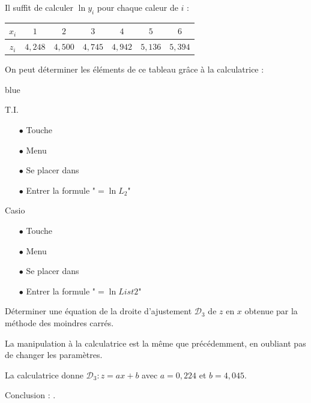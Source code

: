 \documentclass[french]{book}
\begin{document}
Il suffit de calculer $\ln y_i$ pour chaque caleur de $i$ :
\begin{center}
   \begin{tabular}{|*{7}{C{1}|}}
      \hline
      $x_{i}$ & $1$ & $2$ & $3$ & $4$ & $5$ & $6$ \\
      \hline
      $z_{i}$ & $4,248$ & $4,500$ & $4,745$ & $4,942$ & $5,136$ & $5,394$ \\
      \hline
   \end{tabular}
\end{center}

On peut déterminer les éléments de ce tableau grâce à la calculatrice :

\begin{color}{blue}
\begin{multicols}{2}
   T.I.
   \begin{itemize}
      \item[$\bullet$] Touche 
      \item[$\bullet$] Menu 
      \item[$\bullet$] Se placer dans 
      \item[$\bullet$] Entrer la formule "$=\ln L_2$"
   \end{itemize}
   Casio
   \begin{itemize}
      \item[$\bullet$] Touche 
      \item[$\bullet$] Menu 
      \item[$\bullet$] Se placer dans 
      \item[$\bullet$] Entrer la formule "$=\ln List2$"
   \end{itemize}
\end{multicols}
\end{color}




\begin{exemple}
   Déterminer une équation de la droite d'ajustement $\mathcal{D}_3$ de $z$ en $x$ obtenue par la méthode des moindres carrés.  
\end{exemple}

La manipulation à la calculatrice est la même que précédemment, en oubliant pas de changer les paramètres.

La calculatrice donne $\mathcal{D}_3:z=ax+b$ avec $a=0,224$ et $b=4,045$.

Conclusion : .
\end{document}
